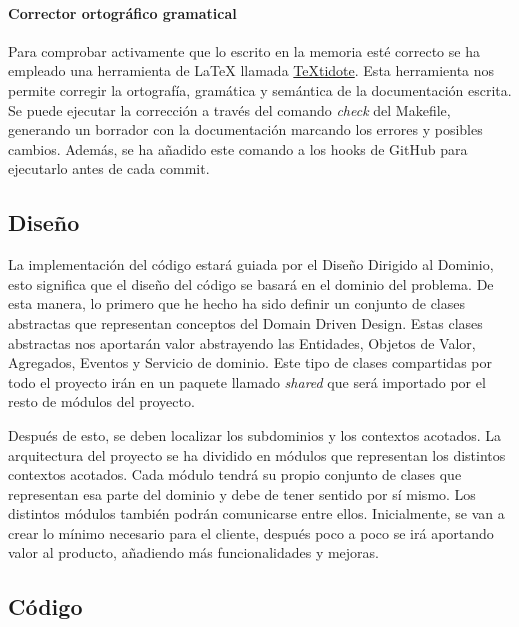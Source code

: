 \paragraph*{Corrector ortográfico gramatical}
Para comprobar activamente que lo escrito en la memoria esté correcto se ha empleado una herramienta de LaTeX llamada \href{https://github.com/sylvainhalle/textidote}{TeXtidote}.
Esta herramienta nos permite corregir la ortografía, gramática y semántica de la documentación escrita. Se puede ejecutar la corrección a través del comando \textit{check} del Makefile,
generando un borrador con la documentación marcando los errores y posibles cambios. Además, se ha añadido este comando a los hooks de GitHub para ejecutarlo antes de cada commit.

\subsection{Diseño}
La implementación del código estará guiada por el Diseño Dirigido al Dominio, esto significa que el diseño del código se basará en el dominio del problema.
De esta manera, lo primero que he hecho ha sido definir un conjunto de clases abstractas que representan conceptos del Domain Driven Design.
Estas clases abstractas nos aportarán valor abstrayendo las Entidades, Objetos de Valor, Agregados, Eventos y Servicio de dominio.
Este tipo de clases compartidas por todo el proyecto irán en un paquete llamado \textit{shared} que será importado por el resto de módulos del proyecto.

Después de esto, se deben localizar los subdominios y los contextos acotados. La arquitectura del proyecto se ha dividido en módulos que representan los distintos contextos acotados.
Cada módulo tendrá su propio conjunto de clases que representan esa parte del dominio y debe de tener sentido por sí mismo. Los distintos módulos también podrán comunicarse entre ellos.
Inicialmente, se van a crear lo mínimo necesario para el cliente, después poco a poco se irá aportando valor al producto, añadiendo más funcionalidades y mejoras.

\subsection{Código}

